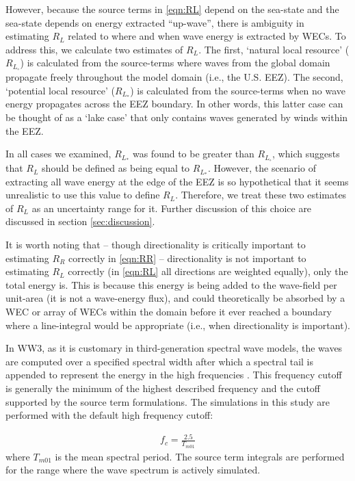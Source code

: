 However, because the source terms in \eqref{eqn:RL} depend on the sea-state and the sea-state depends on energy extracted ``up-wave'', there is ambiguity in estimating $R_L$ related to where and when wave energy is extracted by WECs. To address this, we calculate two estimates of $R_L$. The first, `natural local resource' ($R_{L_\circ}$) is calculated from the source-terms where waves from the global domain propagate freely throughout the model domain (i.e., the U.S. EEZ). The second, `potential local resource' ($R_{L_*}$) is calculated from the source-terms when no wave energy propagates across the EEZ boundary. In other words, this latter case can be thought of as a `lake case' that only contains waves generated by winds within the EEZ. 

In all cases we examined, $R_{L_*}$ was found to be greater than $R_{L_\circ}$, which suggests that $R_L$ should be defined as being equal to $R_{L_*}$. However, the scenario of extracting all wave energy at the edge of the EEZ is so hypothetical that it seems unrealistic to use this value to define $R_L$. Therefore, we treat these two estimates of $R_L$ as an uncertainty range for it.  Further discussion of this choice are discussed in section \ref{sec:discussion}.

It is worth noting that -- though directionality is critically important to estimating $R_R$ correctly in \eqref{eqn:RR} -- directionality is not important to estimating $R_L$ correctly (in \eqref{eqn:RL} all directions are weighted equally), only the total energy is. This is because this energy is being added to the wave-field per unit-area (it is not a wave-energy flux), and could theoretically be absorbed by a WEC or array of WECs within the domain before it ever reached a boundary where a line-integral would be appropriate (i.e., when directionality is important).

In WW3, as it is customary in third-generation spectral wave models, the waves are computed over a specified spectral width after which a spectral tail is appended to represent the energy in the high frequencies \citep[e.g.][]{ardhuinObservationSwellDissipation2009}. This frequency cutoff is generally the minimum of the highest described frequency and the cutoff supported by the source term formulations. The simulations in this study are performed with the default high frequency cutoff:

\begin{align}
  f_{c} = \frac{2.5}{T_{m01}}
\end{align}
where $T_{m01}$ is the mean spectral period. The source term integrals are performed for the range where the wave spectrum is actively simulated.


